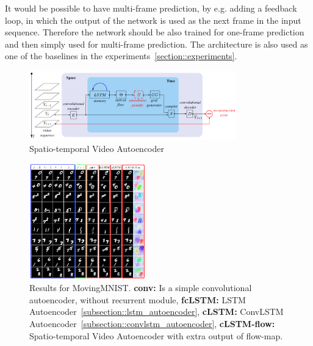   It would be possible to have multi-frame prediction, by e.g. adding a feedback loop, in which the output of the network is used as the next frame in the input 
  sequence. Therefore the network should be also trained for one-frame prediction and then simply used for multi-frame prediction. The architecture is also used
  as one of the baselines in the experiments~\ref{section::experiments}.
  \begin{figure}[H]
   \includegraphics[width=0.8\textwidth]{../Images/patraucean.png}
   \centering
   \caption{Spatio-temporal Video Autoencoder \cite{Patraucean2015}}
   \label{fig:spatiotemp_architecture}
  \end{figure}\noindent
  \begin{figure}[H]
   \includegraphics[width=0.45\textwidth]{../Images/patraucean_results_mnist.png}
   \centering
   \caption{Results for MovingMNIST. \textbf{conv:} Is a simple convolutional autoencoder, without recurrent module, \textbf{fcLSTM:} LSTM Autoencoder~\ref{subsection::lstm_autoencoder},
   \textbf{cLSTM:} ConvLSTM Autoencoder~\ref{subsection::convlstm_autoencoder}, \textbf{cLSTM-flow:} Spatio-temporal Video Autoencoder with extra output of flow-map. \cite{Patraucean2015}}
   \label{fig:spatiotemp_results}
  \end{figure}\noindent
 
